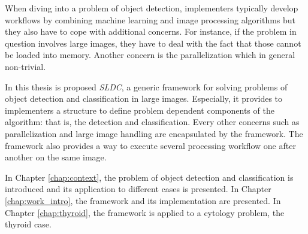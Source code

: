 When diving into a problem of object detection, implementers typically develop workflows by combining machine learning and image processing algorithms but they also have to cope with additional concerns. For instance, if the problem in question involves large images, they have to deal with the fact that those cannot be loaded into memory. Another concern is the parallelization which in general non-trivial.

In this thesis is proposed \textit{SLDC}, a generic framework for solving problems of object detection and classification in large images. Especially, it provides to implementers a structure to define problem dependent components of the algorithm: that is, the detection and classification. Every other concerns such as parallelization and large image handling are encapsulated by the framework. The framework also provides a way to execute several processing workflow one after another on the same image. 

In Chapter \ref{chap:context}, the problem of object detection and classification is introduced and its application to different cases is presented. In Chapter \ref{chap:work_intro}, the framework and its implementation are presented. In Chapter \ref{chap:thyroid}, the framework is applied to a cytology problem, the thyroid case.